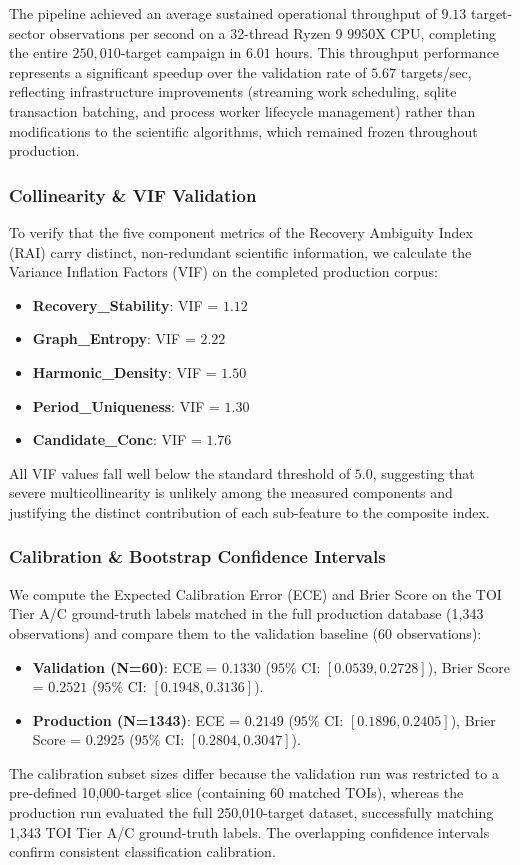 The pipeline achieved an average sustained operational throughput of $9.13$ target-sector observations per second on a 32-thread Ryzen 9 9950X CPU, completing the entire $250,010$-target campaign in $6.01$ hours. This throughput performance represents a significant speedup over the validation rate of $5.67$ targets/sec, reflecting infrastructure improvements (streaming work scheduling, sqlite transaction batching, and process worker lifecycle management) rather than modifications to the scientific algorithms, which remained frozen throughout production.



\subsubsection{Collinearity \& VIF Validation}
To verify that the five component metrics of the Recovery Ambiguity Index (RAI) carry distinct, non-redundant scientific information, we calculate the Variance Inflation Factors (VIF) on the completed production corpus:
\begin{itemize}
    \item \textbf{Recovery\_Stability}: VIF = $1.12$
    \item \textbf{Graph\_Entropy}: VIF = $2.22$
    \item \textbf{Harmonic\_Density}: VIF = $1.50$
    \item \textbf{Period\_Uniqueness}: VIF = $1.30$
    \item \textbf{Candidate\_Conc}: VIF = $1.76$
\end{itemize}
All VIF values fall well below the standard threshold of $5.0$, suggesting that severe multicollinearity is unlikely among the measured components and justifying the distinct contribution of each sub-feature to the composite index.

\subsubsection{Calibration \& Bootstrap Confidence Intervals}
We compute the Expected Calibration Error (ECE) and Brier Score on the TOI Tier A/C ground-truth labels matched in the full production database (1,343 observations) and compare them to the validation baseline (60 observations):
\begin{itemize}
    \item \textbf{Validation (N=60)}: ECE = $0.1330$ ($95\%$ CI: $[0.0539, 0.2728]$), Brier Score = $0.2521$ ($95\%$ CI: $[0.1948, 0.3136]$).
    \item \textbf{Production (N=1343)}: ECE = $0.2149$ ($95\%$ CI: $[0.1896, 0.2405]$), Brier Score = $0.2925$ ($95\%$ CI: $[0.2804, 0.3047]$).
\end{itemize}
The calibration subset sizes differ because the validation run was restricted to a pre-defined 10,000-target slice (containing 60 matched TOIs), whereas the production run evaluated the full 250,010-target dataset, successfully matching 1,343 TOI Tier A/C ground-truth labels. The overlapping confidence intervals confirm consistent classification calibration.


